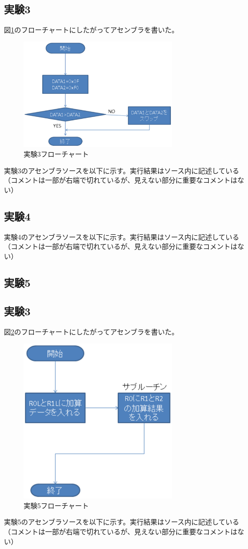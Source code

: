 \documentclass{jarticle}[2012/05/15]
\begin{document}
\subsection{実験3}
図\ref{kadai3flow}のフローチャートにしたがってアセンブラを書いた。
\begin{figure}[htbp]
  \centering
  \includegraphics[width=8cm]{kadai3flow.eps}
  \caption{実験3フローチャート} \label{kadai3flow}
\end{figure}
実験3のアセンブラソースを以下に示す。実行結果はソース内に記述している（コメントは一部が右端で切れているが、見えない部分に重要なコメントはない）
{\scriptsize
 　　
}
\pagebreak
\subsection{実験4}
実験4のアセンブラソースを以下に示す。実行結果はソース内に記述している（コメントは一部が右端で切れているが、見えない部分に重要なコメントはない）
{\scriptsize
 　　
}
\pagebreak
\subsection{実験5}
\subsection{実験3}
図\ref{kadai5flow}のフローチャートにしたがってアセンブラを書いた。
\begin{figure}[htbp]
  \centering
  \includegraphics[width=8cm]{kadai5flow.eps}
  \caption{実験5フローチャート} \label{kadai5flow}
\end{figure}
実験5のアセンブラソースを以下に示す。実行結果はソース内に記述している（コメントは一部が右端で切れているが、見えない部分に重要なコメントはない）
{\scriptsize
 　　
}
\pagebreak
\end{document}
